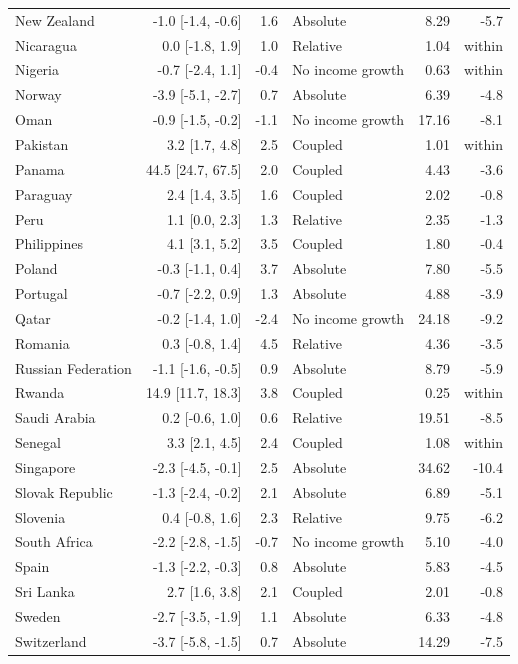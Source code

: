 \begin{longtable}{@{}lrrlrr@{}}
New Zealand & -1.0 [-1.4, -0.6] & 1.6 & Absolute & 8.29 & -5.7 \\
Nicaragua & 0.0 [-1.8, 1.9] & 1.0 & Relative & 1.04 & within \\
Nigeria & -0.7 [-2.4, 1.1] & -0.4 & No income growth & 0.63 & within \\
Norway & -3.9 [-5.1, -2.7] & 0.7 & Absolute & 6.39 & -4.8 \\
Oman & -0.9 [-1.5, -0.2] & -1.1 & No income growth & 17.16 & -8.1 \\
Pakistan & 3.2 [1.7, 4.8] & 2.5 & Coupled & 1.01 & within \\
Panama & 44.5 [24.7, 67.5] & 2.0 & Coupled & 4.43 & -3.6 \\
Paraguay & 2.4 [1.4, 3.5] & 1.6 & Coupled & 2.02 & -0.8 \\
Peru & 1.1 [0.0, 2.3] & 1.3 & Relative & 2.35 & -1.3 \\
Philippines & 4.1 [3.1, 5.2] & 3.5 & Coupled & 1.80 & -0.4 \\
Poland & -0.3 [-1.1, 0.4] & 3.7 & Absolute & 7.80 & -5.5 \\
Portugal & -0.7 [-2.2, 0.9] & 1.3 & Absolute & 4.88 & -3.9 \\
Qatar & -0.2 [-1.4, 1.0] & -2.4 & No income growth & 24.18 & -9.2 \\
Romania & 0.3 [-0.8, 1.4] & 4.5 & Relative & 4.36 & -3.5 \\
Russian Federation & -1.1 [-1.6, -0.5] & 0.9 & Absolute & 8.79 & -5.9 \\
Rwanda & 14.9 [11.7, 18.3] & 3.8 & Coupled & 0.25 & within \\
Saudi Arabia & 0.2 [-0.6, 1.0] & 0.6 & Relative & 19.51 & -8.5 \\
Senegal & 3.3 [2.1, 4.5] & 2.4 & Coupled & 1.08 & within \\
Singapore & -2.3 [-4.5, -0.1] & 2.5 & Absolute & 34.62 & -10.4 \\
Slovak Republic & -1.3 [-2.4, -0.2] & 2.1 & Absolute & 6.89 & -5.1 \\
Slovenia & 0.4 [-0.8, 1.6] & 2.3 & Relative & 9.75 & -6.2 \\
South Africa & -2.2 [-2.8, -1.5] & -0.7 & No income growth & 5.10 & -4.0 \\
Spain & -1.3 [-2.2, -0.3] & 0.8 & Absolute & 5.83 & -4.5 \\
Sri Lanka & 2.7 [1.6, 3.8] & 2.1 & Coupled & 2.01 & -0.8 \\
Sweden & -2.7 [-3.5, -1.9] & 1.1 & Absolute & 6.33 & -4.8 \\
Switzerland & -3.7 [-5.8, -1.5] & 0.7 & Absolute & 14.29 & -7.5 \\

\end{longtable}
